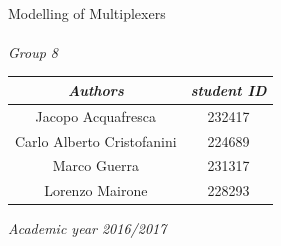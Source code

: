 \begin{titlepage}
	\HRule \\[1cm]
	{ \Huge \textsf{Modelling of Multiplexers}}\\[0.5cm] %
	\HRule \\[1cm]
	\textit{{\large {Group 8}}}\\[0.4cm]
	
	\begin{center}
		\begin{table}[ht]\centering%
			\begin{tabular}{c|c}
				\hline
				\textit{Authors}&\textit{student ID}\\ \hline
				Jacopo Acquafresca&232417\\ \hline
				Carlo Alberto Cristofanini&224689\\ \hline
				Marco Guerra&231317\\ \hline
				Lorenzo Mairone&228293\\ \hline
				
				
			\end{tabular}
			\label{tab:3}
		\end{table}
	\end{center}
	\emph{{\large Academic year 2016/2017}}\\[0.5cm] %
	\vfill %
	\thispagestyle{empty}
\end{titlepage}
